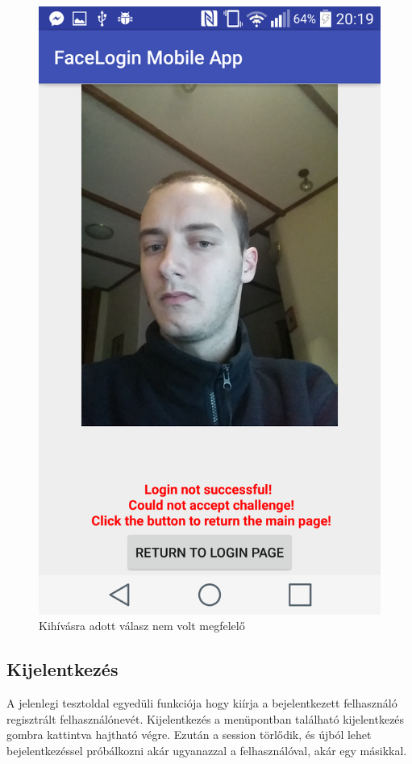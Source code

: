 \begin{figure}[h]
\begin{minipage}{.30\textwidth}
     \includegraphics[scale=0.10]{img/could_not_accept_challenge}
     \caption{Kihívásra adott válasz nem volt megfelelő}
 \end{minipage}
\end{figure}
\subsection{Kijelentkezés}
A jelenlegi tesztoldal egyedüli funkciója hogy kiírja a bejelentkezett felhasználó regisztrált felhasználónevét. Kijelentkezés a menüpontban található kijelentkezés gombra kattintva hajtható végre. Ezután a session törlődik, és újból lehet bejelentkezéssel próbálkozni akár ugyanazzal a felhasználóval, akár egy másikkal.

